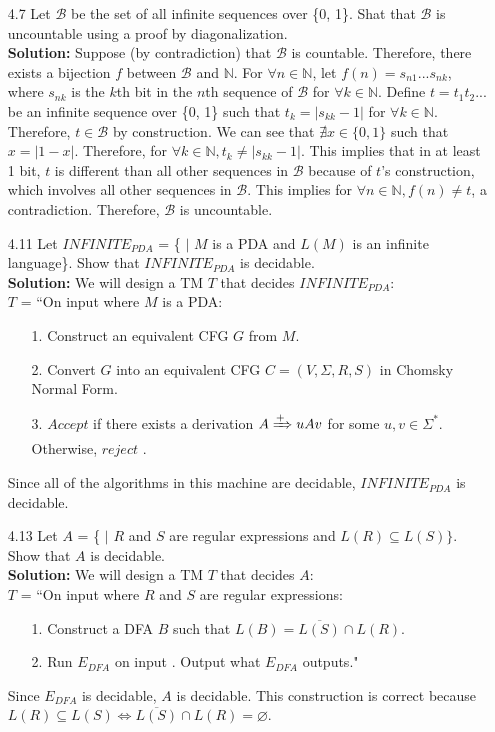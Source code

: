 \begin{enumerate}
\item[4.7]Let $\mathcal{B}$ be the set of all infinite sequences over \{0, 1\}. Shat that $\mathcal{B}$ is uncountable using a proof by diagonalization.
\\
\textbf{Solution:} Suppose (by contradiction) that $\mathcal{B}$ is countable. Therefore, there exists a bijection $f$ between $\mathcal{B}$ and $\mathbb{N}$. For $\forall n \in \mathbb{N}$, let $f(n) = s_{n1}...s_{nk}$, where $s_{nk}$ is the $k$th bit in the $n$th sequence of $\mathcal{B}$ for $\forall{k} \in \mathbb{N}$. Define $t = t_1t_2...$ be an infinite sequence over \{0, 1\} such that $t_k = |s_{kk}-1|$ for $\forall k \in \mathbb{N}$. Therefore, $t \in \mathcal{B}$ by construction. We can see that $\nexists x \in \{0, 1\}$ such that $x = |1-x|$. Therefore, for $\forall k \in \mathbb{N}, t_k \ne |s_{kk} - 1|$. This implies that in at least 1 bit, $t$ is different than all other sequences in $\mathcal{B}$ because of $t$'s construction, which involves all other sequences in $\mathcal{B}$. This implies for $\forall n \in \mathbb{N}, f(n) \ne t$, a contradiction. Therefore, $\mathcal{B}$ is uncountable.

\item[4.11]Let $INFINITE_{PDA}$ = \{ $|$ $M$ is a PDA and $L(M)$ is an infinite language\}. Show that $INFINITE_{PDA}$ is decidable.
\\
\textbf{Solution:} We will design a TM $T$ that decides $INFINITE_{PDA}$:
\\
$T$ = ``On input  where $M$ is a PDA:
\begin{enumerate}
\itemsep0em
\item[1.]Construct an equivalent CFG $G$ from $M$.
\item[2.]Convert $G$ into an equivalent CFG $C = (V, \Sigma, R, S)$ in Chomsky Normal Form.
\item[3.]$Accept$  if there exists a derivation $A \xRightarrow{+} uAv$ for some $u, v \in \Sigma^*$. Otherwise, $reject$ .
\end{enumerate}
Since all of the algorithms in this machine are decidable, $INFINITE_{PDA}$ is decidable.

\item[4.13]Let $A$ = \{ $|$ $R$ and $S$ are regular expressions and $L(R) \subseteq L(S)\}$. Show that $A$ is decidable.
\\
\textbf{Solution:} We will design a TM $T$ that decides $A$:
\\
$T$ = ``On input  where $R$ and $S$ are regular expressions:
\begin{enumerate}
\itemsep0em
\item[1.]Construct a DFA $B$ such that $L(B) = \overline{L(S)} \cap L(R)$.
\item[2.]Run $E_{DFA}$ on input . Output what $E_{DFA}$ outputs."
\end{enumerate}
Since $E_{DFA}$ is decidable, $A$ is decidable. This construction is correct because $L(R) \subseteq L(S) \Leftrightarrow \overline{L(S)} \cap L(R) = \varnothing$.


\end{enumerate}
